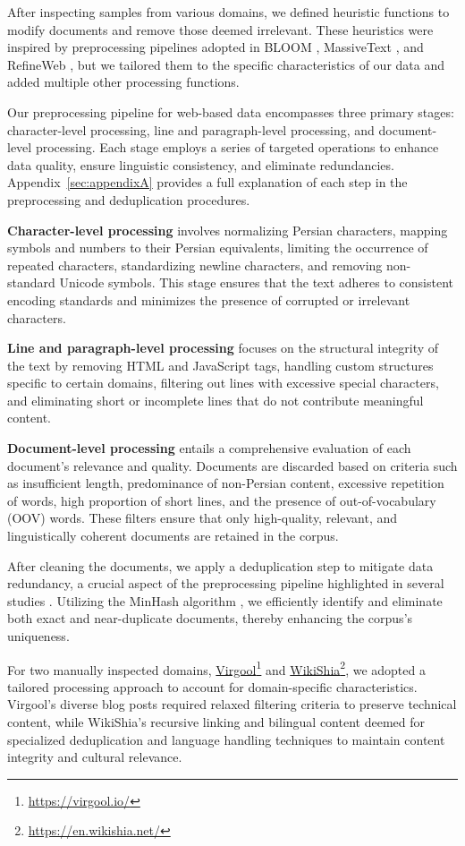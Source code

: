 After inspecting samples from various domains, we defined heuristic functions to modify documents and remove those deemed irrelevant. These heuristics were inspired by preprocessing pipelines adopted in BLOOM \citep{le2023bloom}, MassiveText \citep{muennighoff2022massiveText}, and RefineWeb \citep{penedo2023refinedweb}, but we tailored them to the specific characteristics of our data and added multiple other processing functions. 

Our preprocessing pipeline for web-based data encompasses three primary stages: character-level processing, line and paragraph-level processing, and document-level processing. Each stage employs a series of targeted operations to enhance data quality, ensure linguistic consistency, and eliminate redundancies.  Appendix~\ref{sec:appendixA} provides a full explanation of each step in the preprocessing and deduplication procedures.  

\textbf{Character-level processing} involves normalizing Persian characters, mapping symbols and numbers to their Persian equivalents, limiting the occurrence of repeated characters, standardizing newline characters, and removing non-standard Unicode symbols. This stage ensures that the text adheres to consistent encoding standards and minimizes the presence of corrupted or irrelevant characters.

\textbf{Line and paragraph-level processing} focuses on the structural integrity of the text by removing HTML and JavaScript tags, handling custom structures specific to certain domains, filtering out lines with excessive special characters, and eliminating short or incomplete lines that do not contribute meaningful content.

\textbf{Document-level processing} entails a comprehensive evaluation of each document's relevance and quality. Documents are discarded based on criteria such as insufficient length, predominance of non-Persian content, excessive repetition of words, high proportion of short lines, and the presence of out-of-vocabulary (OOV) words. These filters ensure that only high-quality, relevant, and linguistically coherent documents are retained in the corpus.

After cleaning the documents, we apply a deduplication step to mitigate data redundancy, a crucial aspect of the preprocessing pipeline highlighted in several studies \citep{gao2020pile, penedo2023refinedweb, le2023bloom}.  Utilizing the MinHash algorithm \citep{broder1997minhash}, we efficiently identify and eliminate both exact and near-duplicate documents, thereby enhancing the corpus's uniqueness.

For two manually inspected domains, \href{https://virgool.io/}{Virgool}\footnote{\href{https://virgool.io/}{https://virgool.io/}} and \href{https://en.wikishia.net/}{WikiShia}\footnote{\href{https://en.wikishia.net/}{https://en.wikishia.net/}}, we adopted a tailored processing approach to account for domain-specific characteristics. Virgool's diverse blog posts required relaxed filtering criteria to preserve technical content, while WikiShia's recursive linking and bilingual content deemed for  specialized deduplication and language handling techniques to maintain content integrity and cultural relevance.